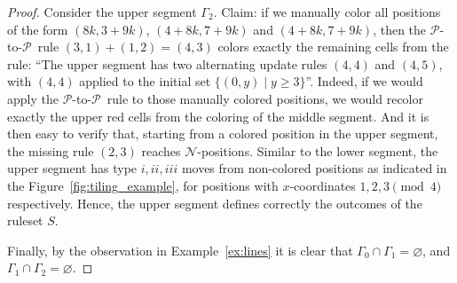 \documentclass{amsart}
\theoremstyle{plain}
\theoremstyle{definition}
\newcommand{\N}{\ensuremath{\mathcal N}}
\renewcommand{\P}{\ensuremath{\mathcal P}}
\renewcommand{\ge}{\geqslant}
\begin{document}
\begin{proof}
    Consider the upper segment $\Gamma_2$. Claim: if we manually color all positions of the form $(8k, 3+9k)$,  $(4+8k,7+9k)$ and $(4+8k,7+9k)$, then the \P-to-\P\ rule $(3,1)+(1,2)=(4,3)$ colors exactly the remaining cells from the rule: ``The upper segment has two alternating update rules $(4,4)$ and $(4,5)$, with $(4,4)$ applied to the initial set $\{(0,y)\mid y\ge 3\}$''. Indeed, if we would apply the \P-to-\P\ rule to those manually colored positions, we would recolor exactly the upper red cells from the coloring of the middle segment. And it is then easy to verify that, starting from a colored position in the upper segment, the missing rule $(2,3)$ reaches \N-positions.  Similar to the lower segment, the upper segment has type $i, ii, iii$ moves from non-colored positions as indicated in the Figure~\ref{fig:tiling_example}, for positions with $x$-coordinates $1,2,3\pmod 4$ respectively. Hence, the upper segment defines correctly the outcomes of the ruleset $S$.

    Finally, by the observation in Example~\ref{ex:lines} it is clear that $\Gamma_0\cap\Gamma_1=\varnothing$, and $\Gamma_1\cap\Gamma_2=\varnothing$.
\end{proof}

  
\end{document}
